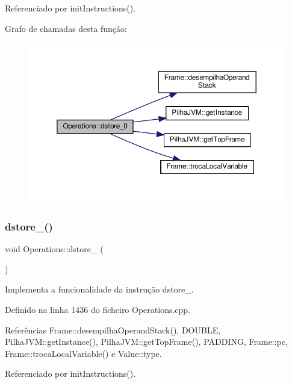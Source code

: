 Referenciado por init\+Instructions().

Grafo de chamadas desta função\+:\nopagebreak
\begin{figure}[H]
\begin{center}
\leavevmode
\includegraphics[width=350pt]{classOperations_a54dd25692395f6671a3a8e21c73eef6d_cgraph}
\end{center}
\end{figure}
\mbox{\label{classOperations_a5f12c99fca34f123522a6c1461782e5f}} 
\subsubsection{\texorpdfstring{dstore\+\_()}{dstore\_1()}}
{\footnotesize\ttfamily void Operations\+::dstore\+\_ (\begin{DoxyParamCaption}{ }\end{DoxyParamCaption})\hspace{0.3cm}{\ttfamily [private]}}



Implementa a funcionalidade da instrução dstore\+\_. 



Definido na linha 1436 do ficheiro Operations.\+cpp.



Referências Frame\+::desempilha\+Operand\+Stack(), D\+O\+U\+B\+LE, Pilha\+J\+V\+M\+::get\+Instance(), Pilha\+J\+V\+M\+::get\+Top\+Frame(), P\+A\+D\+D\+I\+NG, Frame\+::pc, Frame\+::troca\+Local\+Variable() e Value\+::type.



Referenciado por init\+Instructions().

